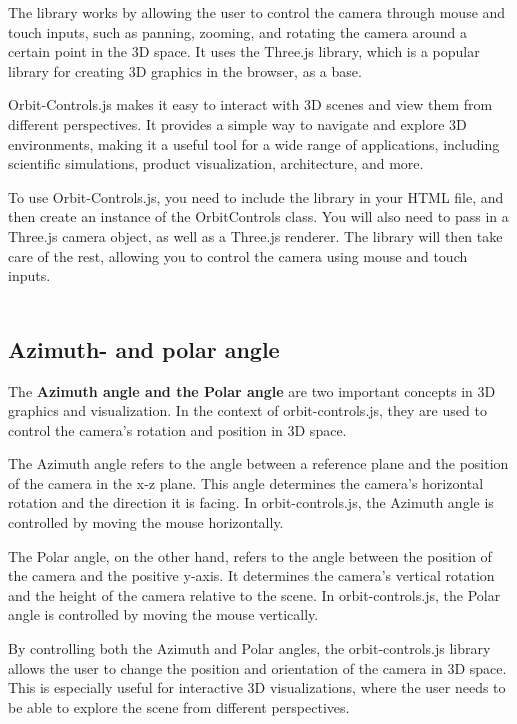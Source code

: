 The library works by allowing the user to control the camera through mouse 
and touch inputs, such as panning, zooming, and rotating the camera around a 
certain point in the 3D space. It uses the Three.js library, which is a popular 
library for creating 3D graphics in the browser, as a base.

Orbit-Controls.js makes it easy to interact with 3D scenes and view them from different 
perspectives. It provides a simple way to navigate and explore 3D environments, making it a 
useful tool for a wide range of applications, including scientific simulations, product visualization, architecture, and more.

To use Orbit-Controls.js, you need to include the library in your HTML file, and then 
create an instance of the OrbitControls class. You will also need to pass in a Three.js 
camera object, as well as a Three.js renderer. The library will then take care of the rest, 
allowing you to control the camera using mouse and touch inputs. \cite{orbitcontrols}
\\
\\
\subsection{Azimuth- and polar angle}
The \textbf{Azimuth angle and the Polar angle} are two important concepts in 3D graphics and visualization. 
In the context of orbit-controls.js, they are used to control the camera's rotation and position in 3D space.

The Azimuth angle refers to the angle between a reference plane and the position of the camera in 
the x-z plane. This angle determines the camera's horizontal rotation and the direction it is facing. 
In orbit-controls.js, the Azimuth angle is controlled by moving the mouse horizontally.

The Polar angle, on the other hand, refers to the angle between the position of the camera and the 
positive y-axis. It determines the camera's vertical rotation and the height of the camera relative 
to the scene. In orbit-controls.js, the Polar angle is controlled by moving the mouse vertically.

By controlling both the Azimuth and Polar angles, the orbit-controls.js library allows the user to 
change the position and orientation of the camera in 3D space. This is especially useful for interactive 
3D visualizations, where the user needs to be able to explore the scene from different perspectives.

